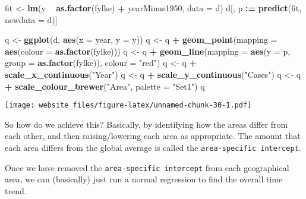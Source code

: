 \documentclass[]{book}
\newenvironment{Shaded}{\begin{snugshade}}{\end{snugshade}}
\newcommand{\KeywordTok}[1]{\textcolor[rgb]{0.13,0.29,0.53}{\textbf{#1}}}
\newcommand{\DataTypeTok}[1]{\textcolor[rgb]{0.13,0.29,0.53}{#1}}
\newcommand{\StringTok}[1]{\textcolor[rgb]{0.31,0.60,0.02}{#1}}
\newcommand{\OperatorTok}[1]{\textcolor[rgb]{0.81,0.36,0.00}{\textbf{#1}}}
\newcommand{\ErrorTok}[1]{\textcolor[rgb]{0.64,0.00,0.00}{\textbf{#1}}}
\newcommand{\NormalTok}[1]{#1}
\begin{document}
\begin{Shaded}
\begin{Highlighting}[]
\NormalTok{fit <-}\StringTok{ }\KeywordTok{lm}\NormalTok{(y }\OperatorTok{~}\StringTok{ }\KeywordTok{as.factor}\NormalTok{(fylke) }\OperatorTok{+}\StringTok{ }\NormalTok{yearMinus1950, }\DataTypeTok{data =}\NormalTok{ d)}
\NormalTok{d[, p }\OperatorTok{:}\ErrorTok{=}\StringTok{ }\KeywordTok{predict}\NormalTok{(fit, }\DataTypeTok{newdata =}\NormalTok{ d)]}

\NormalTok{q <-}\StringTok{ }\KeywordTok{ggplot}\NormalTok{(d, }\KeywordTok{aes}\NormalTok{(}\DataTypeTok{x =}\NormalTok{ year, }\DataTypeTok{y =}\NormalTok{ y))}
\NormalTok{q <-}\StringTok{ }\NormalTok{q }\OperatorTok{+}\StringTok{ }\KeywordTok{geom_point}\NormalTok{(}\DataTypeTok{mapping =} \KeywordTok{aes}\NormalTok{(}\DataTypeTok{colour =} \KeywordTok{as.factor}\NormalTok{(fylke)))}
\NormalTok{q <-}\StringTok{ }\NormalTok{q }\OperatorTok{+}\StringTok{ }\KeywordTok{geom_line}\NormalTok{(}\DataTypeTok{mapping =} \KeywordTok{aes}\NormalTok{(}\DataTypeTok{y =}\NormalTok{ p, }\DataTypeTok{group =} \KeywordTok{as.factor}\NormalTok{(fylke)), }\DataTypeTok{colour =} \StringTok{"red"}\NormalTok{)}
\NormalTok{q <-}\StringTok{ }\NormalTok{q }\OperatorTok{+}\StringTok{ }\KeywordTok{scale_x_continuous}\NormalTok{(}\StringTok{"Year"}\NormalTok{)}
\NormalTok{q <-}\StringTok{ }\NormalTok{q }\OperatorTok{+}\StringTok{ }\KeywordTok{scale_y_continuous}\NormalTok{(}\StringTok{"Cases"}\NormalTok{)}
\NormalTok{q <-}\StringTok{ }\NormalTok{q }\OperatorTok{+}\StringTok{ }\KeywordTok{scale_colour_brewer}\NormalTok{(}\StringTok{"Area"}\NormalTok{, }\DataTypeTok{palette =} \StringTok{"Set1"}\NormalTok{)}
\NormalTok{q}
\end{Highlighting}
\end{Shaded}

\texttt{[image: website\_files/figure-latex/unnamed-chunk-30-1.pdf]}

So how do we achieve this? Basically, by identifying how the areas
differ from each other, and then raising/lowering each area as
appropriate. The amount that each area differs from the global average
is called the \texttt{area-specific\ intercept}.

Once we have removed the \texttt{area-specific\ intercept} from each
geographical area, we can (basically) just run a normal regression to
find the overall time trend.
\end{document}
